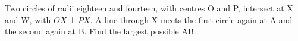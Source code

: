 Two circles of radii eighteen and fourteen, with centres O and P, intersect at X and W, with $OX\perp PX$. A line through X meets the first circle again at A and the second again at B. Find the largest possible AB.
